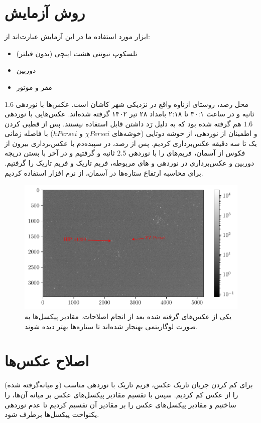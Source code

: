 \documentclass[12pt,a4paper]{article}
\begin{document}
	\section{روش آزمایش}
	ابزار مورد استفاده ما در این آزمایش عبارت‌اند از:
	\begin{itemize}
		\item تلسکوپ نیوتنی هشت اینچی (بدون فیلتر)
		\item دوربین 
		\item مقر و موتور
	\end{itemize}
	محل رصد، روستای ازناوه واقع در نزدیکی شهر کاشان است. عکس‌ها با نوردهی $1.6$ ثانیه و 
	در ساعت ۳۰:۱ تا ۲:۱۸ بامداد ۲۸ تیر ۱۴۰۲ گرفته شده‌اند. عکس‌هایی با نوردهی $1.6$ هم گرفته شده بود
	که به دلیل رَد داشتن قابل استفاده نیستند. پس از قطبی کردن و اطمینان از نوردهی، از خوشه دوتایی
	(خوشه‌های $\chi Persei$ و $h Persei$) با فاصله زمانی یک تا سه دقیقه عکس‌برداری کردیم. پس از رصد،
	در سپیده‌دم با عکس‌برداری بیرون از فکوس از آسمان، فریم‌های  را با نوردهی $2.5$ ثانیه و 
	گرفتیم و در آخر با بستن دریچه دوربین و عکس‌برداری در نوردهی و های مربوطه، فریم تاریک و
	فریم تاریک  را گرفتیم. برای محاسبه ارتفاع ستاره‌ها در آسمان، از نرم افزار  استفاده کردیم.
	\begin{figure}
		\centering
		\includegraphics[width=\linewidth]{../fig/stars}
		\caption{یکی از عکس‌های گرفته شده بعد از انجام اصلاحات. مقادیر پیکسل‌ها به صورت لوگاریتمی بهنجار
			شده‌اند تا ستاره‌ها بهتر دیده شوند.}
	\end{figure}
	\section{اصلاح عکس‌ها}
	برای کم کردن جریان تاریک عکس، فریم تاریک با نوردهی مناسب (و میانه‌گرفته شده) را از عکس کم کردیم.
	سپس با تقسیم مقادیر پیکسل‌های عکس  بر میانه آن‌ها،  را ساختیم و مقادیر پیکسل‌های
	عکس را بر مقادیر آن تقسیم کردیم تا عدم نوردهی یکنواخت پیکسل‌ها برطرف شود.
	
\end{document}
